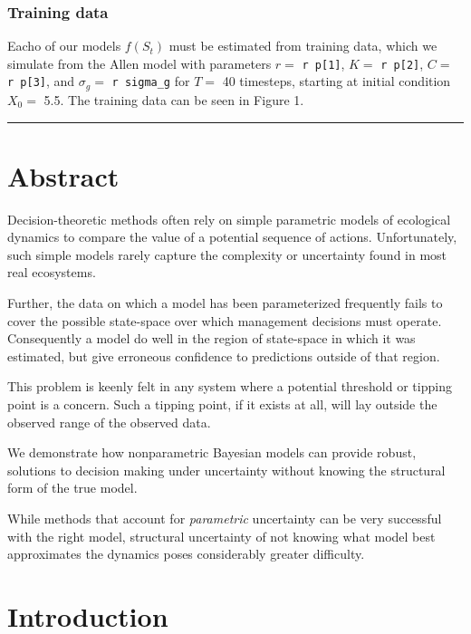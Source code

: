\documentclass[author-year, review]{elsarticle} %
\begin{document}
\subsubsection{Training data}\label{training-data}

Eacho of our models $f(S_t)$ must be estimated from training data, which
we simulate from the Allen model with parameters $r = $
\texttt{r p{[}1{]}}, $K =$ \texttt{r p{[}2{]}}, $C =$
\texttt{r p{[}3{]}}, and $\sigma_g =$ \texttt{r sigma\_g} for $T=$ 40
timesteps, starting at initial condition $X_0 = $ 5.5. The training data
can be seen in Figure 1.

\begin{center}\rule{3in}{0.4pt}\end{center}

\section{Abstract}\label{abstract-1}

Decision-theoretic methods often rely on simple parametric models of
ecological dynamics to compare the value of a potential sequence of
actions. Unfortunately, such simple models rarely capture the complexity
or uncertainty found in most real ecosystems.

Further, the data on which a model has been parameterized frequently
fails to cover the possible state-space over which management decisions
must operate. Consequently a model do well in the region of state-space
in which it was estimated, but give erroneous confidence to predictions
outside of that region.

This problem is keenly felt in any system where a potential threshold or
tipping point is a concern. Such a tipping point, if it exists at all,
will lay outside the observed range of the observed data.

We demonstrate how nonparametric Bayesian models can provide robust,
solutions to decision making under uncertainty without knowing the
structural form of the true model.

While methods that account for \emph{parametric} uncertainty can be very
successful with the right model, structural uncertainty of not knowing
what model best approximates the dynamics poses considerably greater
difficulty.

\section{Introduction}\label{introduction-1}
\end{document}
